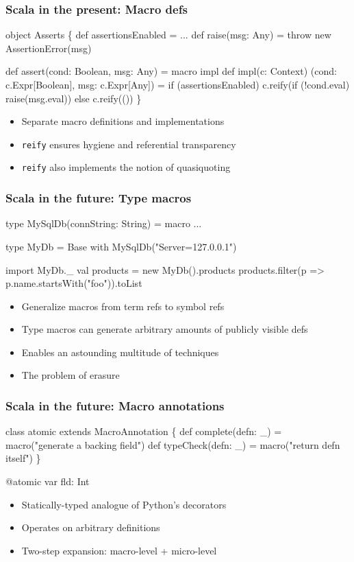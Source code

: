 \documentclass[svgnames,hyperref={bookmarks=false}]{beamer}
\begin{document}
\begin{frame}[fragile]
\frametitle{Scala in the present: Macro defs}
\begin{semiverbatim}
object Asserts \{
  def assertionsEnabled = ...
  def raise(msg: Any) = throw new AssertionError(msg)

  def assert(cond: Boolean, msg: Any) = macro impl
  def impl(c: Context)
          (cond: c.Expr[Boolean], msg: c.Expr[Any]) =
    if (assertionsEnabled)
      c.reify(if (!cond.eval) raise(msg.eval))
    else
      c.reify(())
\}
\end{semiverbatim}

\begin{itemize}
\item Separate macro definitions and implementations
\item \texttt{reify} ensures hygiene and referential transparency
\item \texttt{reify} also implements the notion of quasiquoting
\end{itemize}
\end{frame}

\begin{frame}[fragile]
\frametitle{Scala in the future: Type macros}
\begin{semiverbatim}
type MySqlDb(connString: String) = macro ...

type MyDb = Base with MySqlDb("Server=127.0.0.1")

import MyDb._
val products = new MyDb().products
products.filter(p => p.name.startsWith("foo")).toList

\end{semiverbatim}

\begin{itemize}
\item Generalize macros from term refs to symbol refs
\item Type macros can generate arbitrary amounts of publicly visible defs
\item Enables an astounding multitude of techniques
\item The problem of erasure
\end{itemize}
\end{frame}

\begin{frame}[fragile]
\frametitle{Scala in the future: Macro annotations}
\begin{semiverbatim}
class atomic extends MacroAnnotation \{
  def complete(defn: _) = macro("generate a backing field")
  def typeCheck(defn: _) = macro("return defn itself")
\}

@atomic var fld: Int

\end{semiverbatim}

\begin{itemize}
\item Statically-typed analogue of Python's decorators
\item Operates on arbitrary definitions
\item Two-step expansion: macro-level + micro-level
\end{itemize}
\end{frame}
\end{document}
